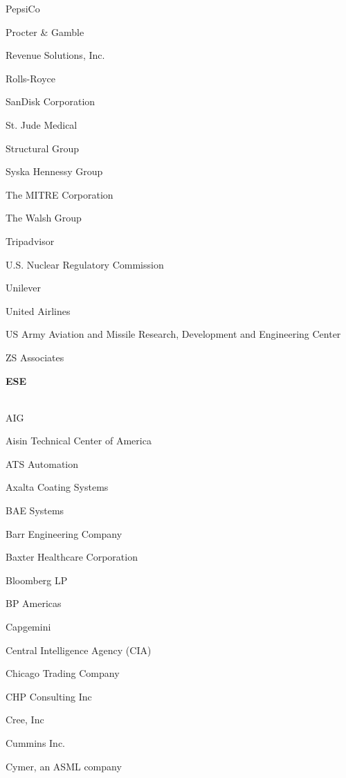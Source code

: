 \documentclass[twoside]{article}
\begin{document}
\begin{center}
\begin{multicols}{5}
\begin{FlushLeft}
\begin{compactitem}
\item PepsiCo
\item Procter \& Gamble
\item Revenue Solutions, Inc.
\item Rolls-Royce
\item SanDisk Corporation
\item St. Jude Medical
\item Structural Group
\item Syska Hennessy Group
\item The MITRE Corporation
\item The Walsh Group
\item Tripadvisor
\item U.S. Nuclear Regulatory Commission
\item Unilever
\item United Airlines
\item US Army Aviation and Missile Research, Development and Engineering Center
\item ZS Associates
\end{compactitem}
        \end{FlushLeft}
        \vspace{1em}
        {\fontsize{14}{16}\selectfont \bf ESE}\\
        \vspace{-1em}
        ~\hrulefill~
        \vspace{-.9em}
        \begin{FlushLeft}
        \begin{compactitem}
        \item AIG
\item Aisin Technical Center of America
\item ATS Automation
\item Axalta Coating Systems
\item BAE Systems
\item Barr Engineering Company
\item Baxter Healthcare Corporation
\item Bloomberg LP
\item BP Americas
\item Capgemini
\item Central Intelligence Agency (CIA)
\item Chicago Trading Company
\item CHP Consulting Inc
\item Cree, Inc
\item Cummins Inc.
\item Cymer, an ASML company

\end{compactitem}
\end{FlushLeft}
\end{multicols}
\end{center}
\end{document}
